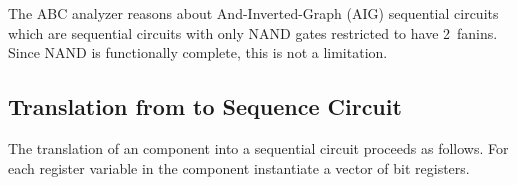 The ABC analyzer reasons about And-Inverted-Graph (AIG)
sequential circuits which are
sequential circuits with only NAND gates restricted to have 2~fanins.
Since NAND is functionally complete, this is not a limitation.  






\subsection{Translation from \caig to Sequence Circuit}
The translation of an \caig component into a sequential circuit 
proceeds as follows.  For each register variable in the component instantiate a 
vector of bit registers. 
